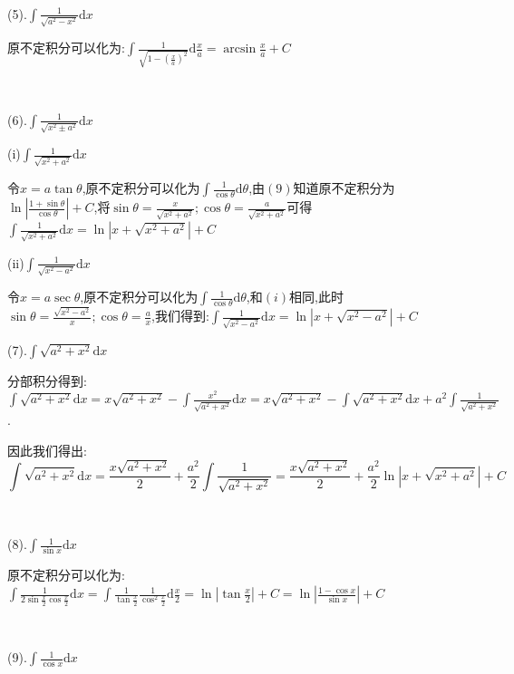 \documentclass[oneside]{book}
\begin{document}
	\hspace{\fill}\
	
	(5).$\int \frac{1}{\sqrt{a^{2}-x^{2}}}\mathrm{d}x$
	
	原不定积分可以化为:$\int \frac{1}{\sqrt{1-(\frac{x}{a})^{2}}}\mathrm{d}\frac{x}{a}=\arcsin\frac{x}{a}+C$
	
	\hspace{\fill}\
	
	(6).$\int \frac{1}{\sqrt{x^{2}\pm a^{2}}}\mathrm{d}x$
	
	(i)$\int \frac{1}{\sqrt{x^{2}+a^{2}}}\mathrm{d}x$
	
	令$x=a\tan \theta$,原不定积分可以化为$\int\frac{1}{\cos \theta}\mathrm{d}\theta$,由$(9)$知道原不定积分为$\ln|\frac{1+\sin \theta}{\cos \theta}|+C$,将$\sin \theta=\frac{x}{\sqrt{x^{2}+a^{2}}};\cos \theta=\frac{a}{\sqrt{x^{2}+a^{2}}}$可得$\int \frac{1}{\sqrt{x^{2}+a^{2}}}\mathrm{d}x=\ln|x+\sqrt{x^{2}+a^{2}}|+C$
	
	(ii)$\int \frac{1}{\sqrt{x^{2}-a^{2}}}\mathrm{d}x$
	
	令$x=a\sec \theta$,原不定积分可以化为$\int \frac{1}{\cos \theta}\mathrm{d}\theta$,和$(i)$相同,此时$\sin \theta=\frac{\sqrt{x^{2}-a^{2}}}{x};\cos \theta=\frac{a}{x}$,我们得到:$\int \frac{1}{\sqrt{x^{2}-a^{2}}}\mathrm{d}x=\ln|x+\sqrt{x^{2}-a^{2}}|+C$
	\hspace{\fill}\
	
	(7).$\int \sqrt{a^{2}+x^{2}}\mathrm{d}x$
	
	分部积分得到:$\int \sqrt{a^{2}+x^{2}}\mathrm{d}x=x\sqrt{a^{2}+x^{2}}-\int \frac{x^{2}}{\sqrt{a^{2}+x^{2}}}\mathrm{d}x=x\sqrt{a^{2}+x^{2}}-\int \sqrt{a^{2}+x^{2}}\mathrm{d}x+a^{2}\int\frac{1}{\sqrt{a^{2}+x^{2}}}$.
	
	因此我们得出:$$\int \sqrt{a^{2}+x^{2}}\mathrm{d}x=\frac{x\sqrt{a^{2}+x^{2}}}{2}+\frac{a^{2}}{2}\int\frac{1}{\sqrt{a^{2}+x^{2}}}=\frac{x\sqrt{a^{2}+x^{2}}}{2}+\frac{a^{2}}{2}\ln|x+\sqrt{x^{2}+a^{2}}|+C$$
	
	\hspace{\fill}\
	
	(8).$\int \frac{1}{\sin x}\mathrm{d}x$
	
	原不定积分可以化为:$\int \frac{1}{2\sin\frac{x}{2}\cos\frac{x}{2}}\mathrm{d}x=\int \frac{1}{\tan \frac{x}{2}}\frac{1}{\cos^{2}\frac{x}{2}}\mathrm{d}\frac{x}{2}=\ln|\tan \frac{x}{2}|+C=\ln|\frac{1-\cos x}{\sin x}|+C$
	
	\hspace{\fill}\
	
	(9).$\int \frac{1}{\cos x}\mathrm{d}x$	
	
\end{document}
